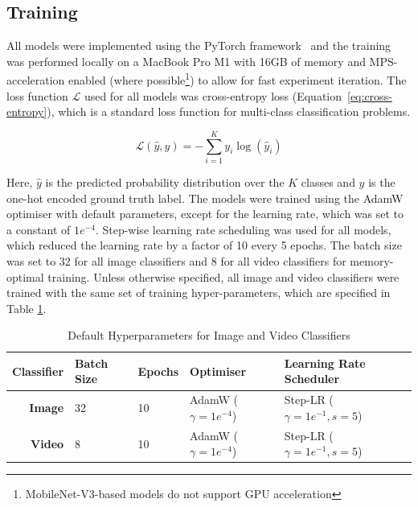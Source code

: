 \documentclass[a4paper]{article}
\begin{document}

  \subsection{Training} %
  \label{sub:training}

  All models were implemented using the PyTorch framework~\cite{pytorch} and the
  training was performed locally on a MacBook Pro M1 with 16GB of memory and
  MPS-acceleration enabled (where possible\footnote{MobileNet-V3-based models do
  not support GPU acceleration}) to allow for fast experiment iteration. The
  loss function $\mathcal{L}$ used for all models was cross-entropy loss
  (Equation~\ref{eq:cross-entropy}), which
  is a standard loss function for multi-class classification problems.

  \begin{equation}
    \mathcal{L}(\hat{y},y) = -\sum_{i=1}^{K} y_i \log(\hat{y}_i)
    \label{eq:cross-entropy}
  \end{equation}

  Here, $\hat{y}$ is the predicted probability distribution over the $K$ classes
  and $y$ is the one-hot encoded ground truth label. The models were trained
  using the AdamW~\cite{adamw} optimiser with default parameters, except for the
  learning rate, which was set to a constant of $1e^{-4}$. Step-wise learning
  rate scheduling was used for all models, which reduced the learning rate by a
  factor of 10 every 5 epochs. The batch size was set to 32 for all image
  classifiers and 8 for all video classifiers for memory-optimal training.
  Unless otherwise specified, all image and video classifiers were trained with
  the same set of training hyper-parameters, which are specified in Table
  \ref{tab:default-hyperparams}. 

  \begin{table}[ht]
    \centering
    \begin{tabular}{rllll}
      \toprule
      Classifier & Batch Size & Epochs & Optimiser & Learning Rate Scheduler \\
      \midrule
      \bfseries Image & 32 & 10 & AdamW ($\gamma=1e^{-4}$) & Step-LR
      ($\gamma=1e^{-1}, s=5$) \\
      \bfseries Video & 8 & 10 & AdamW ($\gamma=1e^{-4}$) & Step-LR
      ($\gamma=1e^{-1}, s=5$) \\
      \bottomrule
    \end{tabular}
    \caption{Default Hyperparameters for Image and Video Classifiers}
    \label{tab:default-hyperparams}
  \end{table}
\end{document}

